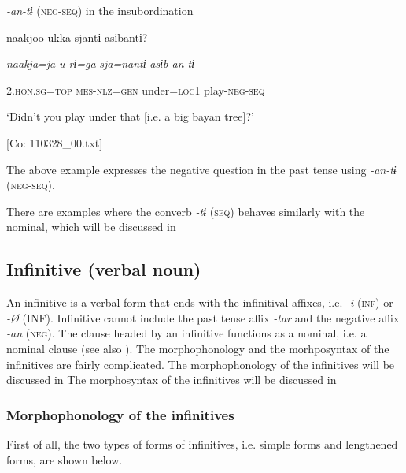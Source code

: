 \ea\label{ex:8-105}
  \textit{{}-an-tɨ} (\textsc{neg}-\textsc{seq}) in the insubordination

  {\TM}
\glll  naakjoo  ukka  sjantɨ  asɨbantɨ?

    \textit{naakja=ja}  \textit{u-rɨ=ga}  \textit{sja=nantɨ}  \textit{asɨb-an-tɨ}

    2.\textsc{hon}.\textsc{sg}=\textsc{top}  \textsc{mes}-\textsc{nlz}=\textsc{gen}  under=\textsc{loc}1  play-\textsc{neg}-\textsc{seq}

    ‘Didn’t you play under that [i.e. a big bayan tree]?’

    [Co: 110328\_00.txt]
\z

The above example expresses the negative question in the past tense using \textit{{}-an-tɨ} (\textsc{neg}-\textsc{seq}).

  There are examples where the converb \textit{{}-tɨ} (\textsc{seq}) behaves similarly with the nominal, which will be discussed in 

\subsection{Infinitive (verbal noun)}

An infinitive is a verbal form that ends with the infinitival affixes, i.e. \textit{{}-i} (\textsc{inf}) or \textit{{}-Ø} (INF). Infinitive cannot include the past tense affix \textit{{}-tar} and the negative affix \textit{{}-an} (\textsc{neg}). The clause headed by an infinitive functions as a nominal, i.e. a nominal clause (see also ). The morphophonology and the morhposyntax of the infinitives are fairly complicated. The morphophonology of the infinitives will be discussed in  The morphosyntax of the infinitives will be discussed in 

\subsubsection{Morphophonology of the infinitives}

First of all, the two types of forms of infinitives, i.e. simple forms and lengthened forms, are shown below.

